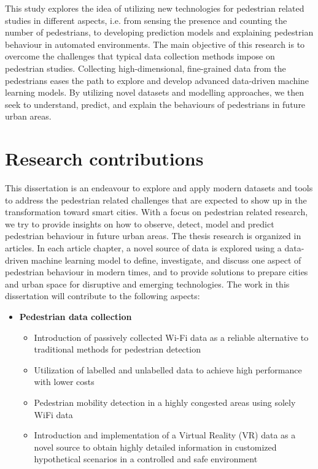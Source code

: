 This study explores the idea of utilizing new technologies for pedestrian related studies in different aspects, i.e. from sensing the presence and counting the number of pedestrians, to developing prediction models and explaining pedestrian behaviour in automated environments. The main objective of this research is to overcome the challenges that typical data collection methods impose on pedestrian studies. Collecting high-dimensional, fine-grained data from the pedestrians eases the path to explore and develop advanced data-driven machine learning models. By utilizing novel datasets and modelling approaches, we then seek to understand, predict, and explain the behaviours of pedestrians in future urban areas.


\section{Research contributions}
This dissertation is an endeavour to explore and apply modern datasets and tools to address the pedestrian related challenges that are expected to show up in the transformation toward smart cities. With a focus on pedestrian related research, we try to provide insights on how to observe, detect, model and predict pedestrian behaviour in future urban areas. The thesis research is organized in articles. In each article chapter, a novel source of data is explored using a data-driven machine learning model to define, investigate, and discuss one aspect of pedestrian behaviour in modern times, and to provide solutions to prepare cities and urban space for disruptive and emerging technologies. The work in this dissertation will contribute to the following aspects:


\begin{itemize}
    \item \textbf{Pedestrian data collection}
    \begin{itemize}
         \item Introduction of passively collected Wi-Fi data as a reliable alternative to traditional methods for pedestrian detection
         \item Utilization of labelled and unlabelled data to achieve high performance with lower costs
         \item Pedestrian mobility detection in a highly congested areas using solely WiFi data
         \item Introduction and implementation of a Virtual Reality (VR) data as a novel source to obtain highly detailed information in customized hypothetical scenarios in a controlled and safe environment
    \end{itemize}
\end{itemize}

